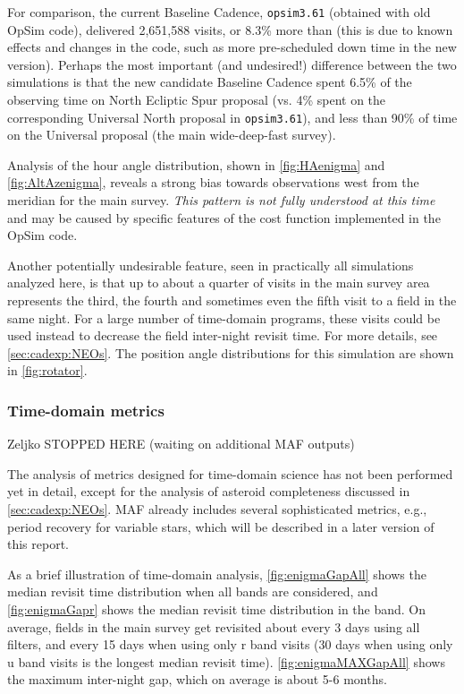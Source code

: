 For comparison, the current Baseline Cadence, \texttt{opsim3.61}
(obtained with old OpSim code), delivered 2,651,588 visits, or 8.3\%
more than   (this is due to known effects and
changes in the code,  such as more pre-scheduled down time in the new
version). Perhaps the most important (and undesired!) difference
between the two simulations is that the new candidate Baseline Cadence
spent 6.5\% of the observing time on North Ecliptic Spur proposal (vs.
4\% spent on the corresponding Universal North proposal in
\texttt{opsim3.61}), and less than 90\% of time on the Universal
proposal (the main wide-deep-fast survey).

Analysis of the hour angle distribution, shown in
\autoref{fig:HAenigma} and \autoref{fig:AltAzenigma}, reveals a strong
bias towards observations west from the meridian for the main survey.
{\it This pattern is not fully understood at this time} and may be
caused by specific features of the cost function implemented in the
OpSim code.

Another potentially undesirable feature, seen in practically all
simulations analyzed here, is that up to about a quarter of visits in
the main survey area represents the third, the fourth and sometimes
even the fifth visit to a field in the same night. For a large number
of time-domain programs, these visits could be used instead to
decrease the field inter-night revisit time. For more details, see
\autoref{sec:cadexp:NEOs}. The position angle distributions for this simulation
are shown in \autoref{fig:rotator}.


\subsubsection{Time-domain metrics}

Zeljko STOPPED HERE  (waiting on additional MAF outputs) 

The analysis of metrics designed for time-domain science has not been
performed yet in detail, except for the analysis of asteroid
completeness discussed in \autoref{sec:cadexp:NEOs}. MAF already includes
several sophisticated metrics, e.g., period recovery for variable
stars, which will be described in a later version of this report.

As a brief illustration of time-domain analysis,
\autoref{fig:enigmaGapAll} shows the median revisit time distribution
when all bands are considered, and \autoref{fig:enigmaGapr} shows the
median revisit time distribution in the band.  On average, fields in
the main survey get revisited about every 3 days using all filters,
and every 15 days when using only r band visits (30 days when using
only u band visits is the longest median revisit time).
\autoref{fig:enigmaMAXGapAll} shows the maximum inter-night gap, which
on average is about 5-6 months.

